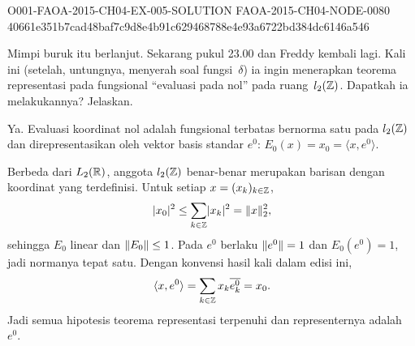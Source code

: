 \begin{o001solution}
  {O001-FAOA-2015-CH04-EX-005-SOLUTION}
  {FAOA-2015-CH04-NODE-0080}
  {40661e351b7cad48baf7c9d8e4b91c629468788e4e93a6722bd384dc6146a546}
\begin{o001statement}
Mimpi buruk itu berlanjut. Sekarang pukul 23.00 dan Freddy kembali lagi.
Kali ini (setelah, untungnya, menyerah soal fungsi~$\delta$) ia ingin
menerapkan teorema representasi pada fungsional ``evaluasi
pada nol'' pada ruang~$l_2(\mathbb{Z})$. Dapatkah ia melakukannya? Jelaskan.
\end{o001statement}
\begin{o001answer}
Ya. Evaluasi koordinat nol adalah fungsional terbatas bernorma satu pada
$l_2(\mathbb{Z})$ dan direpresentasikan oleh vektor basis standar $e^0$:
$E_0(x)=x_0=\langle x,e^0\rangle$.
\end{o001answer}
\begin{o001proof}
Berbeda dari $L_2(\mathbb{R})$, anggota $l_2(\mathbb{Z})$ benar-benar merupakan barisan
dengan koordinat yang terdefinisi. Untuk setiap $x=(x_k)_{k\in\mathbb{Z}}$,
\[
 \lvert x_0\rvert^2\leq\sum_{k\in\mathbb{Z}}\lvert x_k\rvert^2=\lVert x\rVert_2^2,
\]
sehingga $E_0$ linear dan $\lVert E_0\rVert\leq1$. Pada $e^0$ berlaku
$\lVert e^0\rVert=1$ dan $E_0(e^0)=1$, jadi normanya tepat satu. Dengan konvensi
hasil kali dalam edisi ini,
\[
 \langle x,e^0\rangle=\sum_{k\in\mathbb{Z}}x_k\overline{e^0_k}=x_0.
\]
Jadi semua hipotesis teorema representasi terpenuhi dan representernya
adalah~$e^0$.
\end{o001proof}
\end{o001solution}

